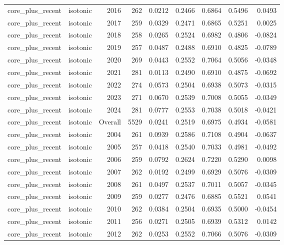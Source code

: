 \begin{table}[t]
\begin{tabular}{@{} l l r r r r r r r @{} }
      core\_plus\_recent & isotonic & 2016 & 262 & 0.0212 & 0.2466 & 0.6864 & 0.5496 & 0.0493 \\
      core\_plus\_recent & isotonic & 2017 & 259 & 0.0329 & 0.2471 & 0.6865 & 0.5251 & 0.0025 \\
      core\_plus\_recent & isotonic & 2018 & 258 & 0.0265 & 0.2524 & 0.6982 & 0.4806 & -0.0824 \\
      core\_plus\_recent & isotonic & 2019 & 257 & 0.0487 & 0.2488 & 0.6910 & 0.4825 & -0.0789 \\
      core\_plus\_recent & isotonic & 2020 & 269 & 0.0443 & 0.2552 & 0.7064 & 0.5056 & -0.0348 \\
      core\_plus\_recent & isotonic & 2021 & 281 & 0.0113 & 0.2490 & 0.6910 & 0.4875 & -0.0692 \\
      core\_plus\_recent & isotonic & 2022 & 274 & 0.0573 & 0.2504 & 0.6938 & 0.5073 & -0.0315 \\
      core\_plus\_recent & isotonic & 2023 & 271 & 0.0670 & 0.2539 & 0.7008 & 0.5055 & -0.0349 \\
      core\_plus\_recent & isotonic & 2024 & 281 & 0.0777 & 0.2553 & 0.7038 & 0.5018 & -0.0421 \\
      core\_plus\_recent & isotonic & Overall & 5529 & 0.0241 & 0.2519 & 0.6975 & 0.4934 & -0.0581 \\
      core\_plus\_recent & isotonic & 2004 & 261 & 0.0939 & 0.2586 & 0.7108 & 0.4904 & -0.0637 \\
      core\_plus\_recent & isotonic & 2005 & 257 & 0.0418 & 0.2540 & 0.7033 & 0.4981 & -0.0492 \\
      core\_plus\_recent & isotonic & 2006 & 259 & 0.0792 & 0.2624 & 0.7220 & 0.5290 & 0.0098 \\
      core\_plus\_recent & isotonic & 2007 & 262 & 0.0192 & 0.2499 & 0.6929 & 0.5076 & -0.0309 \\
      core\_plus\_recent & isotonic & 2008 & 261 & 0.0497 & 0.2537 & 0.7011 & 0.5057 & -0.0345 \\
      core\_plus\_recent & isotonic & 2009 & 259 & 0.0277 & 0.2476 & 0.6885 & 0.5521 & 0.0541 \\
      core\_plus\_recent & isotonic & 2010 & 262 & 0.0384 & 0.2504 & 0.6935 & 0.5000 & -0.0454 \\
      core\_plus\_recent & isotonic & 2011 & 256 & 0.0271 & 0.2505 & 0.6939 & 0.5312 & 0.0142 \\
      core\_plus\_recent & isotonic & 2012 & 262 & 0.0253 & 0.2552 & 0.7066 & 0.5076 & -0.0309 \\

\end{tabular}
\end{table}
